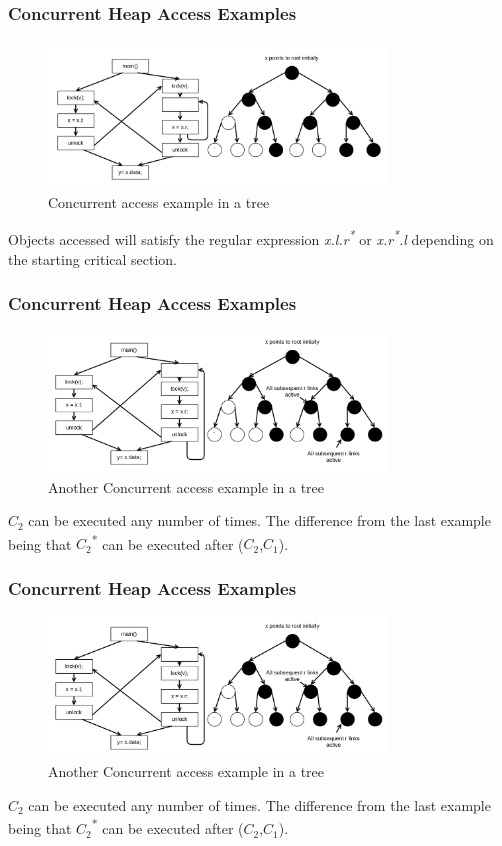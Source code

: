 \documentclass{beamer}
\begin{document}
\begin{frame}
	\frametitle{Concurrent Heap Access Examples}
	\begin{figure}
		\centering
		\includegraphics[width=0.8\textwidth]{Figures/tree2.png}
		\caption{Concurrent access example in a tree}
		\label{fig:ch5example}
	\end{figure}
	Objects accessed will satisfy the regular expression \emph{x.l.r\textsuperscript{*}} or \emph{x.r\textsuperscript{*}.l} depending on the starting critical section.
\end{frame}

\begin{frame}
	\frametitle{Concurrent Heap Access Examples}
	\begin{figure}
		\centering
		\includegraphics[width=0.8\textwidth]{Figures/tree3.png}
		\caption{Another Concurrent access example in a tree}
		\label{fig:ch5example}
	\end{figure}
	$C_2$ can be executed any number of times. The difference from the last example being that $C_2$\textsuperscript{*} can be executed after ($C_2$,$C_1$).
\end{frame}

\begin{frame}
	\frametitle{Concurrent Heap Access Examples}
	\begin{figure}
		\centering
		\includegraphics[width=0.8\textwidth]{Figures/tree3.png}
		\caption{Another Concurrent access example in a tree}
		\label{fig:ch5example}
	\end{figure}
	$C_2$ can be executed any number of times. The difference from the last example being that $C_2$\textsuperscript{*} can be executed after ($C_2$,$C_1$).
\end{frame}
\end{document}
